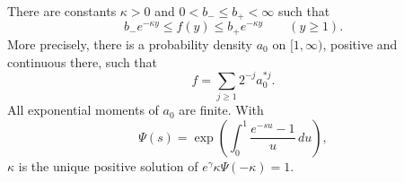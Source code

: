 \documentclass[11pt,letterpaper]{article}
\begin{document}
\begin{lemma}
\label{lem:positive-renewal}
There are constants $\kappa>0$ and $0<b_-\le b_+<\infty$ such that
\begin{equation}\label{eq:two-sided-f}
 b_-e^{-\kappa y}\le f(y)\le b_+e^{-\kappa y}\qquad(y\ge1).
\end{equation}
More precisely, there is a probability density $a_0$ on $[1,\infty)$,
positive and continuous there, such that
\begin{equation}\label{eq:positive-geometric}
 f=\sum_{j\ge1}2^{-j}a_0^{*j}.
\end{equation}
All exponential moments of $a_0$ are finite. With
\[
 \Psi(s)=\exp\left(\int_0^1\frac{e^{-su}-1}{u}\,du\right),
\]
$\kappa$ is the unique positive solution of
$e^\gamma\kappa\Psi(-\kappa)=1$.
\end{lemma}
\end{document}
